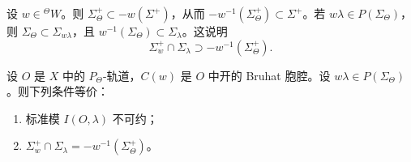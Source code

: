 设 $w\in{}^{\Theta}W$。则 $\Sigma^+_\Theta\subset-w(\Sigma^+)$，从而 $-w^{-1}(\Sigma^+_\Theta)\subset\Sigma^+$。若 $w\lambda\in P(\Sigma_\Theta)$，则 $\Sigma_\Theta\subset\Sigma_{w\lambda}$，且 $w^{-1}(\Sigma_\Theta)\subset\Sigma_\lambda$。这说明
$$\Sigma^+_w\cap\Sigma_\lambda\supset-w^{-1}(\Sigma^+_\Theta).$$

\begin{theorem}\label{thm:06.2.12}
设 $O$ 是 $X$ 中的 $P_\Theta$-轨道，$C(w)$ 是 $O$ 中开的 Bruhat 胞腔。设 $w\lambda\in P(\Sigma_\Theta)$。则下列条件等价：
\begin{enumerate}[label=(\roman*)]
\item 标准模 $I(O,\lambda)$ 不可约；
\item $\Sigma^+_w\cap\Sigma_\lambda=-w^{-1}(\Sigma^+_\Theta)$。
\end{enumerate}
\end{theorem}

